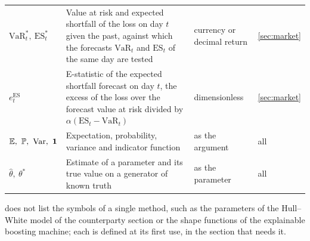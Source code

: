 \begin{table}[htbp]
\begin{tabularx}{\textwidth}{>{\raggedright\arraybackslash}p{2.6cm}>{\raggedright\arraybackslash}X>{\raggedright\arraybackslash}p{2.7cm}>{\raggedright\arraybackslash}p{2.9cm}}
$\mathrm{VaR}^{\ast}_t,\ \mathrm{ES}^{\ast}_t$ & Value at risk and expected shortfall of the loss on day $t$ given the past, against which the forecasts $\mathrm{VaR}_t$ and $\mathrm{ES}_t$ of the same day are tested & currency or decimal return & \cref{sec:market} \\
$e^{\mathrm{ES}}_t$ & E-statistic of the expected shortfall forecast on day $t$, the excess of the loss over the forecast value at risk divided by $\alpha(\mathrm{ES}_t-\mathrm{VaR}_t)$ & dimensionless & \cref{sec:market} \\
$\E,\ \Prob,\ \Var,\ \indic$ & Expectation, probability, variance and indicator function & as the argument & all \\
$\hat\theta,\ \theta^\ast$ & Estimate of a parameter and its true value on a generator of known truth & as the parameter & all \\
\bottomrule
\end{tabularx}
\end{table}

 does not list the symbols of a single method, such as the parameters of the Hull--White model of the counterparty section or the shape functions of the explainable boosting
machine; each is defined at its first use, in the section that needs it.

